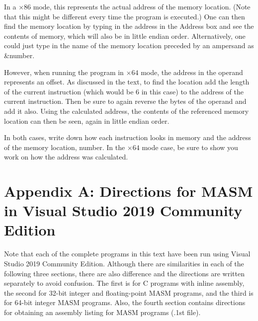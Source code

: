 \documentclass[10pt]{article}
\begin{document}
In a $\times 86$ mode, this represents the actual address of the memory location. (Note that this might be different every time the program is executed.) One can then find the memory location by typing in the address in the Address box and see the contents of memory, which will also be in little endian order. Alternatively, one could just type in the name of the memory location preceded by an ampersand as \&number.

However, when running the program in $\times 64$ mode, the address in the operand represents an offset. As discussed in the text, to find the location add the length of the current instruction (which would be 6 in this case) to the address of the current instruction. Then be sure to again reverse the bytes of the operand and add it also. Using the calculated address, the contents of the referenced memory location can then be seen, again in little endian order.

In both cases, write down how each instruction looks in memory and the address of the memory location, number. In the $\times 64$ mode case, be sure to show you work on how the address was calculated.

\section*{Appendix A: Directions for MASM in Visual Studio 2019 Community Edition}
Note that each of the complete programs in this text have been run using Visual Studio 2019 Community Edition. Although there are similarities in each of the following three sections, there are also difference and the directions are written separately to avoid confusion. The first is for C programs with inline assembly, the second for 32-bit integer and floating-point MASM programs, and the third is for 64-bit integer MASM programs. Also, the fourth section contains directions for obtaining an assembly listing for MASM programs (.1st file).
\end{document}
